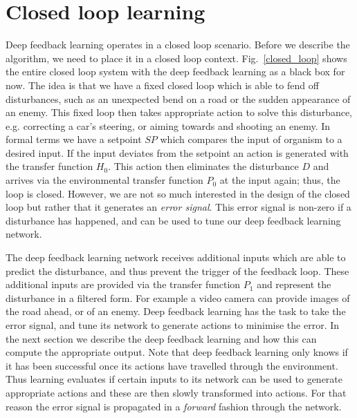 \documentclass{aamas2018}
\begin{document}
\section{Closed loop learning}
Deep feedback learning operates in a closed loop scenario. Before we
describe the algorithm, we need to place it in a closed loop
context. Fig.~\ref{closed_loop} shows the entire closed loop system
with the deep feedback learning as a black box for now. The idea is
that we have a fixed closed loop which is able to fend off
disturbances, such as an unexpected bend on a road or the sudden
appearance of an enemy. This fixed loop then takes appropriate action
to solve this disturbance, e.g. correcting a car's steering, or aiming
towards and shooting an enemy. In formal terms we have a setpoint $SP$
which compares the input of organism to a desired input. If the input
deviates from the setpoint an action is generated with the transfer
function $H_0$. This action then eliminates the disturbance $D$ and
arrives via the environmental transfer function $P_0$ at the input
again; thus, the loop is closed. However, we are not so much
interested in the design of the closed loop but rather that it
generates an \textsl{error signal}. This error signal is non-zero if a
disturbance has happened, and can be used to tune our deep feedback
learning network.

The deep feedback learning network receives additional inputs which are able
to predict the disturbance, and thus prevent the trigger of the feedback
loop. These additional inputs are provided via the transfer function $P_1$
and represent the disturbance in a filtered form. For example a video camera
can provide images of the road ahead, or of an enemy. Deep feedback
learning has the task to take the error signal, and tune its network
to generate actions to minimise the error. In the next section
we describe the deep feedback learning and how this can
compute the appropriate output. Note that deep feedback learning only knows if it has been
successful once its actions have travelled through the environment. Thus learning
evaluates if certain inputs to its network can be used to generate
appropriate actions and these are then slowly transformed into actions.
For that reason the error signal is propagated in a \textsl{forward} fashion
through the network.
\end{document}
